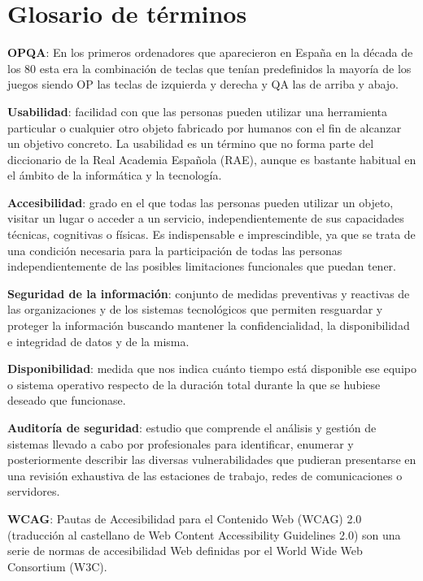 \chapter{Glosario de términos}


\textbf{OPQA}: En los primeros ordenadores que aparecieron en España en la década de los 80 esta era la combinación de teclas que tenían predefinidos la mayoría de los juegos siendo OP las teclas de izquierda y derecha y QA las de arriba y abajo.
\bigskip

\textbf{Usabilidad}: facilidad con que las personas pueden utilizar una herramienta particular o cualquier otro objeto fabricado por humanos con el fin de alcanzar un objetivo concreto. La usabilidad es un término que no forma parte del diccionario de la Real Academia Española (RAE), aunque es bastante habitual en el ámbito de la informática y la tecnología.
\bigskip

\textbf{Accesibilidad}: grado en el que todas las personas pueden utilizar un objeto, visitar un lugar o acceder a un servicio, independientemente de sus capacidades técnicas, cognitivas o físicas. Es indispensable e imprescindible, ya que se trata de una condición necesaria para la participación de todas las personas independientemente de las posibles limitaciones funcionales que puedan tener.
\bigskip

\textbf{Seguridad de la información}: conjunto de medidas preventivas y reactivas de las organizaciones y de los sistemas tecnológicos que permiten resguardar y proteger la información buscando mantener la confidencialidad, la disponibilidad e integridad de datos y de la misma.
\bigskip

\textbf{Disponibilidad}: medida que nos indica cuánto tiempo está disponible ese equipo o sistema operativo respecto de la duración total durante la que se hubiese deseado que funcionase.
\bigskip

 \textbf{Auditoría de seguridad}: estudio que comprende el análisis y gestión de sistemas llevado a cabo por profesionales para identificar, enumerar y posteriormente describir las diversas vulnerabilidades que pudieran presentarse en una revisión exhaustiva de las estaciones de trabajo, redes de comunicaciones o servidores.
\bigskip

 \textbf{WCAG}: Pautas de Accesibilidad para el Contenido Web (WCAG) 2.0 (traducción al castellano de Web Content Accessibility Guidelines 2.0) son una serie de normas de accesibilidad Web definidas por el World Wide Web Consortium (W3C).
\bigskip




